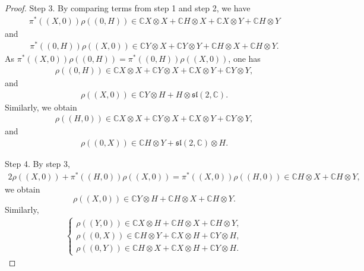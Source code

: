 \documentclass[reqno]{amsart}
\theoremstyle{definition}
\begin{document}
\begin{proof}
Step 3. By  comparing terms from  step 1 and step 2, we have
\begin{eqnarray*}
\pi^{\ast}((X,0))\rho((0,H))\in \mathbb{C} X\otimes X+\mathbb{C} H\otimes X+\mathbb{C} X\otimes Y+\mathbb{C} H\otimes Y
\end{eqnarray*}
and
\begin{eqnarray*}
\pi^{\ast}((0,H))\rho((X,0))\in \mathbb{C} Y\otimes X+\mathbb{C} Y\otimes Y+\mathbb{C} H\otimes X+\mathbb{C} H\otimes Y.
\end{eqnarray*}
As $\pi^{\ast}((X,0))\rho((0,H))=\pi^{\ast}((0,H))\rho((X,0))$, one has
\begin{eqnarray*}
\rho((0,H))\in \mathbb{C} X\otimes X+\mathbb{C} Y\otimes X+\mathbb{C} X\otimes Y+\mathbb{C} Y\otimes Y,
\end{eqnarray*}
and
\begin{eqnarray*}
\rho((X,0))\in \mathbb{C}Y\otimes H+H\otimes\mathfrak{sl}(2,\mathbb{C}).
\end{eqnarray*}
Similarly, we obtain
\begin{eqnarray*}
\rho((H,0))\in \mathbb{C} X\otimes X+\mathbb{C} Y\otimes X+\mathbb{C} X\otimes Y+\mathbb{C} Y\otimes Y,
\end{eqnarray*}
and
\begin{eqnarray*}
\rho((0,X))\in  \mathbb{C} H\otimes Y+\mathfrak{sl}(2,\mathbb{C})\otimes H.
\end{eqnarray*}


Step 4. By step 3,
\begin{eqnarray*}
2\rho((X,0))+\pi^{\ast}((H,0))\rho((X,0))=\pi^{\ast}((X,0))\rho((H,0))\in \mathbb{C}H\otimes X+\mathbb{C}H\otimes Y,
\end{eqnarray*}
we obtain
$$\rho((X,0))\in \mathbb{C}Y\otimes H+\mathbb{C}H\otimes X+\mathbb{C}H\otimes Y.$$
Similarly,
\begin{eqnarray*}
\begin{cases}
\rho((Y,0))\in \mathbb{C}X\otimes H+\mathbb{C}H\otimes X+\mathbb{C}H\otimes Y,\\
\rho((0,X))\in \mathbb{C}H\otimes Y+\mathbb{C}X\otimes H+\mathbb{C}Y\otimes H, \\
\rho((0,Y))\in \mathbb{C}H\otimes X+\mathbb{C}X\otimes H+\mathbb{C}Y\otimes H.
\end{cases}
\end{eqnarray*}


\end{proof}
\end{document}
